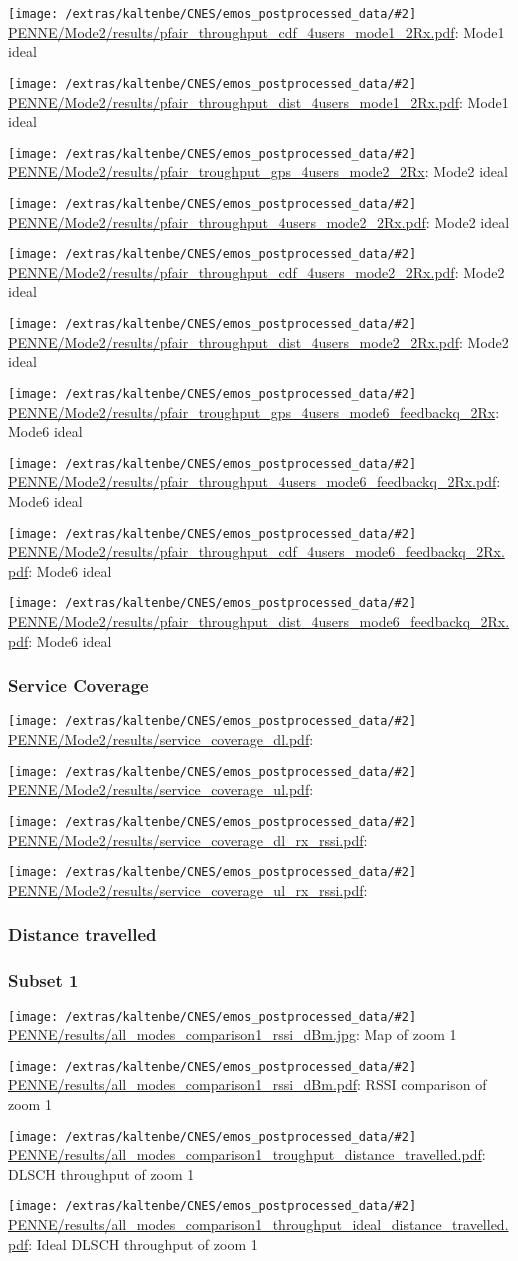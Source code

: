 \documentclass[a4paper,10pt]{article}
\newcommand{\printfile}[2][]{
 \begin{minipage}{8cm}
  \centering
  \texttt{[image: /extras/kaltenbe/CNES/emos\_postprocessed\_data/\#2]}
  \url{#2}: #1

 \end{minipage}
}
\begin{document}
\printfile[Mode1 ideal]{PENNE/Mode2/results/pfair_throughput_cdf_4users_mode1_2Rx.pdf}
\printfile[Mode1 ideal]{PENNE/Mode2/results/pfair_throughput_dist_4users_mode1_2Rx.pdf}

\printfile[Mode2 ideal]{PENNE/Mode2/results/pfair_troughput_gps_4users_mode2_2Rx}
\printfile[Mode2 ideal]{PENNE/Mode2/results/pfair_throughput_4users_mode2_2Rx.pdf}

\printfile[Mode2 ideal]{PENNE/Mode2/results/pfair_throughput_cdf_4users_mode2_2Rx.pdf}
\printfile[Mode2 ideal]{PENNE/Mode2/results/pfair_throughput_dist_4users_mode2_2Rx.pdf}

\printfile[Mode6 ideal]{PENNE/Mode2/results/pfair_troughput_gps_4users_mode6_feedbackq_2Rx}
\printfile[Mode6 ideal]{PENNE/Mode2/results/pfair_throughput_4users_mode6_feedbackq_2Rx.pdf}

\printfile[Mode6 ideal]{PENNE/Mode2/results/pfair_throughput_cdf_4users_mode6_feedbackq_2Rx.pdf}
\printfile[Mode6 ideal]{PENNE/Mode2/results/pfair_throughput_dist_4users_mode6_feedbackq_2Rx.pdf}


\subsubsection{Service Coverage}

\printfile{PENNE/Mode2/results/service_coverage_dl.pdf}
\printfile{PENNE/Mode2/results/service_coverage_ul.pdf}

\printfile{PENNE/Mode2/results/service_coverage_dl_rx_rssi.pdf}
\printfile{PENNE/Mode2/results/service_coverage_ul_rx_rssi.pdf}

\subsubsection{Distance travelled}
\label{sec:dist_travelled_penne}

\subsubsection*{Subset 1}

\printfile[Map of zoom 1]{PENNE/results/all_modes_comparison1_rssi_dBm.jpg}
\printfile[RSSI comparison of zoom 1]{PENNE/results/all_modes_comparison1_rssi_dBm.pdf}

\printfile[DLSCH throughput of zoom 1]{PENNE/results/all_modes_comparison1_troughput_distance_travelled.pdf}
\printfile[Ideal DLSCH throughput of zoom 1]{PENNE/results/all_modes_comparison1_throughput_ideal_distance_travelled.pdf}
\end{document}

